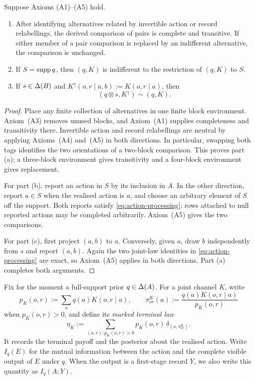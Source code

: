\begin{lemma}\label{lf:lem:bookkeeping}
Suppose Axioms \textup{(A1)--(A5)} hold.
\begin{enumerate}[label=\textup{(\alph*)},leftmargin=*]
\item After identifying alternatives related by invertible action or record
  relabellings, the derived comparison of pairs is complete and transitive.
  If either member of a pair comparison is replaced by an indifferent
  alternative, the comparison is unchanged.
\item If $S=\operatorname{supp} q$, then $(q,K)$ is indifferent to the restriction of
  $(q,K)$ to $S$.
\item If $s\in\Delta(B)$ and $K^\uparrow(o,r\mid a,b):=K(o,r\mid a)$, then
  \begin{equation}
  (q\otimes s,K^\uparrow)\sim(q,K).
  \label{lf:eq:dummy-ordinal}
  \end{equation}
\end{enumerate}
\end{lemma}

\begin{proof}
Place any finite collection of alternatives in one finite block environment.
Axiom~\textup{(A3)} removes unused blocks, and Axiom~\textup{(A1)} supplies
completeness and transitivity there.  Invertible action and record relabellings
are neutral by applying Axioms~\textup{(A4)} and~\textup{(A5)} in both
directions.  In particular, swapping both tags identifies the two orientations
of a two-block comparison.  This proves part \textup{(a)}; a three-block
environment gives transitivity and a four-block environment gives replacement.

For part \textup{(b)}, report an action in $S$ by its inclusion in $A$.  In the
other direction, report $a\in S$ when the realised action is $a$, and choose an
arbitrary element of $S$ off the support.  Both reports satisfy
\eqref{eq:action-processing}; rows attached to null reported actions may be
completed arbitrarily.  Axiom~\textup{(A5)} gives the two comparisons.

For part \textup{(c)}, first project $(a,b)$ to $a$.  Conversely, given $a$,
draw $b$ independently from $s$ and report $(a,b)$.  Again the two joint-law
identities in \eqref{eq:action-processing} are exact, so Axiom~\textup{(A5)}
applies in both directions.  Part \textup{(a)} completes both arguments.
\end{proof}

Fix for the moment a full-support prior $q\in\Delta(A)$.  For a joint channel $K$,
write
\[
p_K(o,r):=\sum_a q(a)K(o,r\mid a),
\qquad
\pi^K_{or}(a):=\frac{q(a)K(o,r\mid a)}{p_K(o,r)}
\]
when $p_K(o,r)>0$, and define its \emph{marked terminal law}
\begin{equation}
\eta_K:=\sum_{(o,r):p_K(o,r)>0}
p_K(o,r)\,\delta_{(o,\pi^K_{or})}.
\label{lf:eq:marked-law}
\end{equation}
It records the terminal payoff and the posterior about the realised action.
Write $I_q(E)$ for the mutual information between the action and the complete
visible output of $E$ under $q$.  When the output is a first-stage record $Y$,
we also write this quantity as $I_q(A;Y)$.

